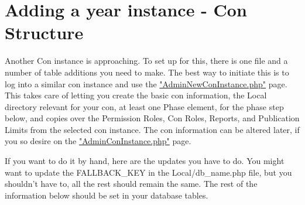 \documentclass[captions=tablesignature]{scrartcl}
\begin{document}
\section{Adding a year instance - Con Structure}
\label{sec-11}

Another Con instance is approaching.  To set up for this, there is
one file and a number of table additions you need to make.  The best
way to initiate this is to log into a similar con instance and use
the \href{../webpages/AdminNewConInstance.php}{"AdminNewConInstance.php"} page.  This takes care of letting you
create the basic con information, the Local directory relevant for
your con, at least one Phase element, for the phase step below, and
copies over the Permission Roles, Con Roles, Reports, and
Publication Limits from the selected con instance.  The con
information can be altered later, if you so desire on the
\href{../webpages/AdminConInstance.php}{"AdminConInstance.php"} page.

If you want to do it by hand, here are the updates you have to do.
You might want to update the FALLBACK\_KEY in the Local/db\_name.php
file, but you shouldn't have to, all the rest should remain the
same.  The rest of the information below should be set in your
database tables.
\end{document}

